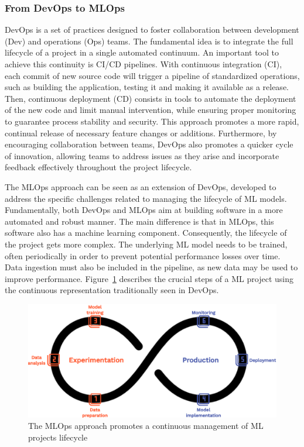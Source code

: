 \subsubsection{From DevOps to MLOps}

DevOps is a set of practices designed to foster collaboration between development (Dev) and operations (Ops) teams. The fundamental idea is to integrate the full lifecycle of a project in a single automated continuum. An important tool to achieve this continuity is CI/CD pipelines. With continuous integration (CI), each commit of new source code will trigger a pipeline of standardized operations, such as building the application, testing it and making it available as a release. Then, continuous deployment (CD) consists in tools to automate the deployment of the new code and limit manual intervention, while ensuring proper monitoring to guarantee process stability and security. This approach promotes a more rapid, continual release of necessary feature changes or additions. Furthermore, by encouraging collaboration between teams, DevOps also promotes a quicker cycle of innovation, allowing teams to address issues as they arise and incorporate feedback effectively throughout the project lifecycle.

The MLOps approach can be seen as an extension of DevOps, developed to address the specific challenges related to managing the lifecycle of ML models. Fundamentally, both DevOps and MLOps aim at building software in a more automated and robust manner. The main difference is that in MLOps, this software also has a machine learning component. Consequently, the lifecycle of the project gets more complex. The underlying ML model needs to be trained, often periodically in order to prevent potential performance losses over time. Data ingestion must also be included in the pipeline, as new data may be used to improve performance. Figure~\ref{fig:mlops-cycle} describes the crucial steps of a ML project using the continuous representation traditionally seen in DevOps.

\begin{figure}[htbp]
    \centering
    \includegraphics[width=\textwidth]{sections/img/mlops-cycle.png}
    \caption{The MLOps approach promotes a continuous management of ML projects lifecycle}
    \label{fig:mlops-cycle}
\end{figure}

